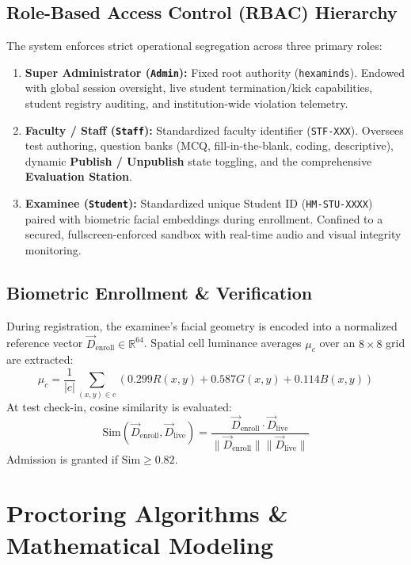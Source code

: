 \documentclass[conference]{IEEEtran}
\begin{document}
\subsection{Role-Based Access Control (RBAC) Hierarchy}
The system enforces strict operational segregation across three primary roles:
\begin{enumerate}
    \item \textbf{Super Administrator (\texttt{Admin}):} Fixed root authority (\texttt{hexaminds}). Endowed with global session oversight, live student termination/kick capabilities, student registry auditing, and institution-wide violation telemetry.
    \item \textbf{Faculty / Staff (\texttt{Staff}):} Standardized faculty identifier (\texttt{STF-XXX}). Oversees test authoring, question banks (MCQ, fill-in-the-blank, coding, descriptive), dynamic \textbf{Publish / Unpublish} state toggling, and the comprehensive \textbf{Evaluation Station}.
    \item \textbf{Examinee (\texttt{Student}):} Standardized unique Student ID (\texttt{HM-STU-XXXX}) paired with biometric facial embeddings during enrollment. Confined to a secured, fullscreen-enforced sandbox with real-time audio and visual integrity monitoring.
\end{enumerate}

\subsection{Biometric Enrollment \& Verification}
During registration, the examinee's facial geometry is encoded into a normalized reference vector $\vec{D}_{\text{enroll}} \in \mathbb{R}^{64}$. Spatial cell luminance averages $\mu_c$ over an $8 \times 8$ grid are extracted:
\begin{equation}
\mu_{c} = \frac{1}{|c|} \sum_{(x,y) \in c} \left( 0.299 R(x,y) + 0.587 G(x,y) + 0.114 B(x,y) \right)
\end{equation}
At test check-in, cosine similarity is evaluated:
\begin{equation}
\text{Sim}(\vec{D}_{\text{enroll}}, \vec{D}_{\text{live}}) = \frac{\vec{D}_{\text{enroll}} \cdot \vec{D}_{\text{live}}}{\|\vec{D}_{\text{enroll}}\| \|\vec{D}_{\text{live}}\|}
\end{equation}
Admission is granted if $\text{Sim} \ge 0.82$.

\section{Proctoring Algorithms \& Mathematical Modeling}
\end{document}
